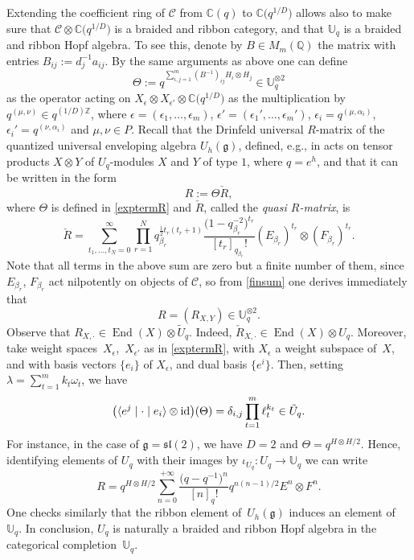 \documentclass[pdftex]{sigma}%
\numberwithin{equation}{section}
\numberwithin{figure}{section}
\newcommand{\mUq}{\mathbb{U}_q}
\newcommand{\mc}{\mathbb{C}}
\newcommand{\mz}{\mathbb{Z}}
\newcommand{\ra}{\rightarrow}
\begin{document}
Extending the coefficient ring of $\mathcal{C}$ from $\mc(q)$ to $\mc\big(q^{1/D}\big)$ allows also to make sure that $\mathcal{C}\otimes \mc\big(q^{1/D}\big)$ is a braided and ribbon category, and that $\mUq$ is a braided and ribbon Hopf algebra. To see this, denote by $B\in M_m(\mathbb{Q})$ the matrix with entries $B_{ij}:=d_j^{-1}a_{ij}$. By the same arguments as above one can define
\begin{equation}\label{exptermR}
\Theta := q^{\sum_{i,j=1}^m (B^{-1})_{ij} H_i\otimes H_j} \in \mUq^{\otimes 2}
\end{equation}
as the operator acting on $X_\epsilon \otimes X_{\epsilon'}\otimes \mc\big(q^{1/D}\big)$ as the multiplication by $q^{(\mu,\nu)} \in q^{(1/D)\mz}$, where $\epsilon=(\epsilon_1,\dots,\epsilon_m)$, $\epsilon'=(\epsilon_1',\dots,\epsilon_m')$, $\epsilon_i = q^{(\mu,\alpha_i)}$, $\epsilon_i' = q^{(\nu,\alpha_i)}$ and $\mu,\nu \in P$. Recall that the Drinfeld universal $R$-matrix of the quantized universal enveloping algebra $U_h(\mathfrak{g})$, defined, e.g., in \cite[Chapter~8.3.C]{CP} acts on tensor products $X\otimes Y$ of $U_q$-modules $X$ and $Y$ of type $1$, where $q=e^h$, and that it can be written in the form
\[R := \Theta \check{R},\]
where $\Theta$ is defined in \eqref{exptermR} and $\check{R}$, called the {\it quasi $R$-matrix}, is
\begin{equation}\label{Rcheck}
\check{R} = \sum_{t_1,\dots,t_N=0}^\infty \prod_{r=1}^N q_{\beta_r}^{\frac{1}{2}t_r(t_r+1)} \frac{\big(1-q_{\beta_r}^{-2}\big)^{t_r}}{[t_r]_{q_{\beta_r}} !} (E_{\beta_r})^{t_r} \otimes (F_{\beta_r})^{t_r}.
\end{equation}
Note that all terms in the above sum are zero but a finite number of them, since $E_{\beta_r}$, $F_{\beta_r}$ act nilpotently on objects of $\mathcal{C}$, so from \eqref{finsum} one derives immediately that
\[R = (R_{X,Y})\in \mUq^{\otimes 2}.\]
Observe that $R_{X,\cdot} \in \operatorname{End}(X) \otimes \tilde U_q$. Indeed, $\check{R}_{X,\cdot} \in \operatorname{End}(X) \otimes U_q$. Moreover, take weight spaces~$X_\epsilon$,~$X_{\epsilon'}$ as in \eqref{exptermR}, with $X_\epsilon$ a weight subspace of~$X$, and with basis vectors $\{e_i\}$ of $X_\epsilon$, and dual basis $\{e^i\}$. Then, setting $\lambda = \sum_{t=1}^m k_t\omega_t$, we have
\begin{equation}\label{Thetaeval}
\big(\langle e^j \mid \cdot \mid e_i\rangle \otimes {\rm id}\big)(\Theta) = \delta_{i,j}\prod_{t=1}^m \ell_t^{k_t} \in \tilde U_q.
\end{equation}
For instance, in the case of $\mathfrak{g}={\mathfrak{sl}}(2)$, we have $D=2$ and $\Theta = q^{H\otimes H/2}$. Hence, identifying elements of $U_q$ with their images by $\iota_{U_q}\colon U_q \ra \mUq$ we can write
\begin{equation}\label{Rsl2}
R=q^{H\otimes H/2} \sum_{n=0}^{+\infty}\frac{\big(q-q^{-1}\big)^n}{[n]_q!} q^{n(n-1)/2}E^n\otimes F^n.
\end{equation}
One checks similarly that the ribbon element of~$U_h(\mathfrak{g})$ induces an element of~$\mUq$. In conclusion, $U_q$ is naturally a braided and ribbon Hopf algebra in the categorical completion~$\mUq$.
\end{document}
